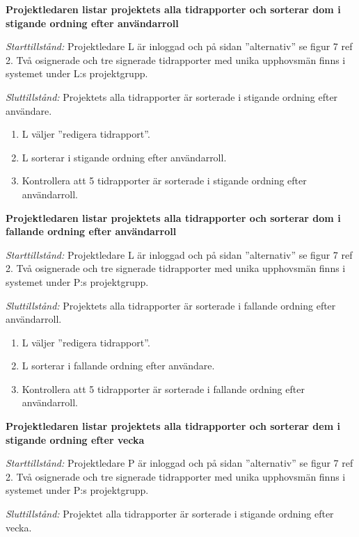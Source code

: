 \documentclass[a4paper]{article}
\begin{document}
\begin{FT}
\item %
\textbf{Projektledaren listar projektets alla tidrapporter och sorterar dom i stigande ordning efter användarroll}

\emph{Starttillstånd:} Projektledare L är inloggad och på sidan ''alternativ'' se figur 7 ref 2. Två osignerade och tre signerade tidrapporter med unika upphovsmän finns i systemet under L:s projektgrupp.

\emph{Sluttillstånd:} Projektets alla tidrapporter är sorterade i stigande ordning efter användare.

\begin{enumerate}
\item L väljer ''redigera tidrapport''.
\item L sorterar i stigande ordning efter användarroll.
\item Kontrollera att 5 tidrapporter är sorterade i stigande ordning efter användarroll.
\end{enumerate}

\item %
\textbf{Projektledaren listar projektets alla tidrapporter och sorterar dom i fallande ordning efter användarroll}

\emph{Starttillstånd:} Projektledare L är inloggad och på sidan ''alternativ'' se figur 7 ref 2. Två osignerade och tre signerade tidrapporter med unika upphovsmän finns i systemet under P:s projektgrupp.

\emph{Sluttillstånd:} Projektets alla tidrapporter är sorterade i fallande ordning efter användarroll.

\begin{enumerate}
\item L väljer ''redigera tidrapport''.
\item L sorterar i fallande ordning efter användare.
\item Kontrollera att 5 tidrapporter är sorterade i fallande ordning efter användarroll.
\end{enumerate}

\item %
\textbf{Projektledaren listar projektets alla tidrapporter och sorterar dem i stigande ordning efter vecka}

\emph{Starttillstånd:} Projektledare P är inloggad och på sidan ''alternativ'' se figur 7 ref 2. Två osignerade och tre signerade tidrapporter med unika upphovsmän finns i systemet under P:s projektgrupp.

\emph{Sluttillstånd:} Projektet alla tidrapporter är sorterade i stigande ordning efter vecka.


\end{FT}
\end{document}
